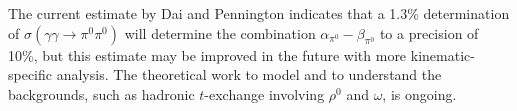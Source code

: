 The current estimate by Dai and Pennington \cite{Dai:2016ytz} indicates
that a 1.3\% determination of
$\sigma(\gamma\gamma\rightarrow\pi^0\pi^0)$ will determine the
combination $\alpha_{\pi^0}-\beta_{\pi^0}$ to a precision of 10\%,
but this estimate may be improved in the future with more kinematic-specific analysis. The theoretical work to model and to understand the backgrounds, such as
hadronic $t$-exchange involving $\rho^0$ and $\omega$, is ongoing.
